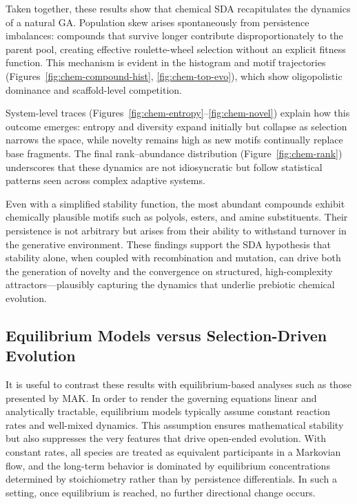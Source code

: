 \documentclass[life,article,submit,pdftex,moreauthors]{Definitions/mdpi}
\begin{document}
Taken together, these results show that chemical SDA recapitulates the dynamics of a natural GA. Population skew arises spontaneously from persistence imbalances: compounds that survive longer contribute disproportionately to the parent pool, creating effective roulette-wheel selection without an explicit fitness function. This mechanism is evident in the histogram and motif trajectories (Figures~\ref{fig:chem-compound-hist}, \ref{fig:chem-top-evo}), which show oligopolistic dominance and scaffold-level competition.  

System-level traces (Figures~\ref{fig:chem-entropy}--\ref{fig:chem-novel}) explain how this outcome emerges: entropy and diversity expand initially but collapse as selection narrows the space, while novelty remains high as new motifs continually replace base fragments. The final rank–abundance distribution (Figure~\ref{fig:chem-rank}) underscores that these dynamics are not idiosyncratic but follow statistical patterns seen across complex adaptive systems.  

Even with a simplified stability function, the most abundant compounds exhibit chemically plausible motifs such as polyols, esters, and amine substituents. Their persistence is not arbitrary but arises from their ability to withstand turnover in the generative environment. These findings support the SDA hypothesis that stability alone, when coupled with recombination and mutation, can drive both the generation of novelty and the convergence on structured, high-complexity attractors—plausibly capturing the dynamics that underlie prebiotic chemical evolution.  


\subsection{Equilibrium Models versus Selection-Driven Evolution}

It is useful to contrast these results with equilibrium-based analyses such as those presented by MAK. In order to render the governing equations linear and analytically tractable, equilibrium models typically assume constant reaction rates and well-mixed dynamics. This assumption ensures mathematical stability but also suppresses the very features that drive open-ended evolution. With constant rates, all species are treated as equivalent participants in a Markovian flow, and the long-term behavior is dominated by equilibrium concentrations determined by stoichiometry rather than by persistence differentials. In such a setting, once equilibrium is reached, no further directional change occurs.
\end{document}
